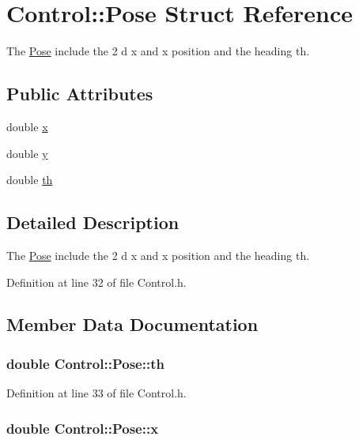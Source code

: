 \hypertarget{structControl_1_1Pose}{\section{Control\-:\-:Pose Struct Reference}
\label{structControl_1_1Pose}
}


The \hyperlink{structControl_1_1Pose}{Pose} include the 2 d x and x position and the heading th.  


\subsection*{Public Attributes}
\begin{DoxyCompactItemize}
\item 
double \hyperlink{structControl_1_1Pose_a716e747ccfb8060b84df73c4674d805a}{x}
\item 
double \hyperlink{structControl_1_1Pose_ae8439b6ee06ad57f0a2e6d01efd71788}{y}
\item 
double \hyperlink{structControl_1_1Pose_a9a7a416fd183a855ff9af3efef811e2e}{th}
\end{DoxyCompactItemize}


\subsection{Detailed Description}
The \hyperlink{structControl_1_1Pose}{Pose} include the 2 d x and x position and the heading th. 

Definition at line 32 of file Control.\-h.



\subsection{Member Data Documentation}
\hypertarget{structControl_1_1Pose_a9a7a416fd183a855ff9af3efef811e2e}{
\subsubsection[{th}]{\setlength{\rightskip}{0pt plus 5cm}double Control\-::\-Pose\-::th}}\label{structControl_1_1Pose_a9a7a416fd183a855ff9af3efef811e2e}


Definition at line 33 of file Control.\-h.

\hypertarget{structControl_1_1Pose_a716e747ccfb8060b84df73c4674d805a}{
\subsubsection[{x}]{\setlength{\rightskip}{0pt plus 5cm}double Control\-::\-Pose\-::x}}\label{structControl_1_1Pose_a716e747ccfb8060b84df73c4674d805a}


